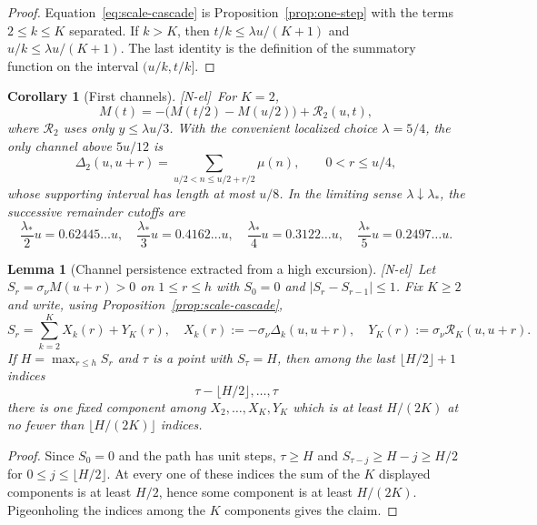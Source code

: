 \documentclass[11pt]{amsart}
\numberwithin{equation}{section}
\theoremstyle{plain}
\newtheorem{lemma}[theorem]{Lemma}
\newtheorem{corollary}[theorem]{Corollary}
\theoremstyle{definition}
\theoremstyle{remark}
\newcommand{\tagNE}{\textup{[N-el]}}
\begin{document}
\begin{proof}
Equation~\eqref{eq:scale-cascade} is Proposition~\ref{prop:one-step} with
the terms $2\le k\le K$ separated.  If $k>K$, then
$t/k\le\lambda u/(K+1)$ and $u/k\le\lambda u/(K+1)$.  The last identity is
the definition of the summatory function on the interval $(u/k,t/k]$.
\end{proof}

\begin{corollary}[First channels]
\label{cor:first-channels}
\tagNE\ For $K=2$,
\[
M(t)=-\bigl(M(t/2)-M(u/2)\bigr)+\mathcal R_2(u,t),
\]
where $\mathcal R_2$ uses only $y\le\lambda u/3$.  With the convenient localized
choice $\lambda=5/4$, the only channel above $5u/12$ is
\[
\Delta_2(u,u+r)=\sum_{u/2<n\le u/2+r/2}\mu(n),
\qquad 0<r\le u/4,
\]
whose supporting interval has length at most $u/8$.  In the limiting
sense $\lambda\downarrow\lambda_*$, the successive remainder cutoffs are
\[
\frac{\lambda_*}{2}u=0.62445\ldots u,\quad
\frac{\lambda_*}{3}u=0.4162\ldots u,\quad
\frac{\lambda_*}{4}u=0.3122\ldots u,\quad
\frac{\lambda_*}{5}u=0.2497\ldots u.
\]
\end{corollary}

\begin{lemma}[Channel persistence extracted from a high excursion]
\label{lem:channel-persistence}
\tagNE\ Let $S_r=\sigma_\nu M(u+r)>0$ on $1\le r\le h$ with $S_0=0$ and
$|S_r-S_{r-1}|\le1$.  Fix $K\ge2$ and write, using
Proposition~\ref{prop:scale-cascade},
\[
S_r=\sum_{k=2}^{K}X_k(r)+Y_K(r),
\quad
X_k(r):=-\sigma_\nu\Delta_k(u,u+r),
\quad
Y_K(r):=\sigma_\nu \mathcal R_K(u,u+r).
\]
If $H=\max_{r\le h}S_r$ and $\tau$ is a point with $S_\tau=H$, then among
the last $\lfloor H/2\rfloor+1$ indices
\[
\tau-\lfloor H/2\rfloor,\ldots,\tau
\]
there is one fixed component among
$X_2,\ldots,X_K,Y_K$ which is at least $H/(2K)$ at no fewer than
$\lfloor H/(2K)\rfloor$ indices.
\end{lemma}

\begin{proof}
Since $S_0=0$ and the path has unit steps, $\tau\ge H$ and
$S_{\tau-j}\ge H-j\ge H/2$ for
$0\le j\le\lfloor H/2\rfloor$.  At every one of these indices the sum of
the $K$ displayed components is at least $H/2$, hence some component is at
least $H/(2K)$.  Pigeonholing the indices among the $K$ components gives the
claim.
\end{proof}
\end{document}
